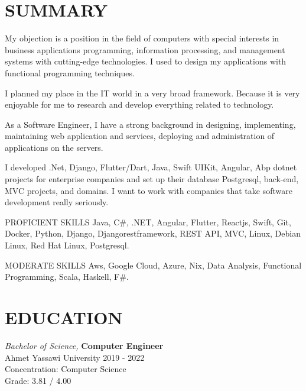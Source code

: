 \documentclass[line,margin]{res}
\begin{document}
\address{emre.yildiz.dev@hotmail.com}
\address{\href{https://linkedin.com/in/emre-yildiz-297ab0242}{https://linkedin.com/in/emre-yildiz-297ab0242}} 


 
\begin{resume}
 
\section{SUMMARY}   My objection is a position in the field of computers with special 
                interests in business applications programming, 
                information processing, and management systems with cutting-edge technologies. I used to design my applications with functional programming techniques. 
                
I planned my place in the IT world in a very broad framework. Because it is very enjoyable for me to research and develop everything related to technology.

As a Software Engineer, I have a strong background in designing, implementing, maintaining web application and services, deploying and administration of applications  on the servers.

I developed .Net, Django, Flutter/Dart, Java, Swift UIKit, Angular, Abp dotnet projects for enterprise companies and set up their database Postgresql, back-end, MVC projects, and domains.
I want to work with companies that take software development really seriously.

PROFICIENT SKILLS
Java, C\#, .NET, Angular, Flutter, Reactjs, Swift, Git, Docker, Python, Django, Djangorestframework, REST API, MVC, Linux, Debian Linux, Red Hat Linux, Postgresql.

MODERATE SKILLS
Aws, Google Cloud, Azure, Nix, Data Analysis, Functional Programming, Scala, Haskell, F\#.
 
 
\section{EDUCATION} {\sl Bachelor of Science,} \textbf{Computer Engineer} \\
                Ahmet Yassawi University 
                2019 - 2022 \\
                Concentration: Computer Science \\
                Grade: 3.81 / 4.00 


\end{resume}
\end{document}
